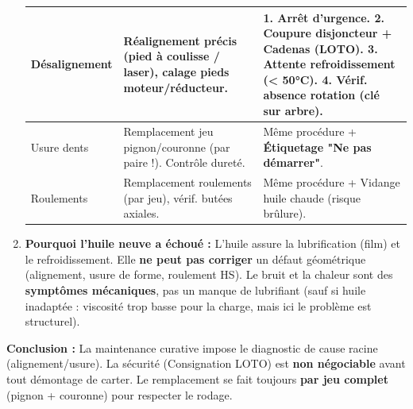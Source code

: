 \documentclass[11pt]{article}
\begin{document}
\begin{exoresolu}
\begin{enumerate}
\begin{center}
\begin{tabularx}{\linewidth}{|l|X|X|}
                      Désalignement & Réalignement précis (pied à coulisse / laser), calage pieds moteur/réducteur. & \textbf{1. Arrêt d'urgence.} \textbf{2. Coupure disjoncteur + Cadenas (LOTO).} \textbf{3. Attente refroidissement (< 50°C).} \textbf{4. Vérif. absence rotation (clé sur arbre).} \\ \hline
                      Usure dents & Remplacement jeu pignon/couronne (par paire !). Contrôle dureté. & Même procédure + \textbf{Étiquetage "Ne pas démarrer"}. \\ \hline
                      Roulements & Remplacement roulements (par jeu), vérif. butées axiales. & Même procédure + Vidange huile chaude (risque brûlure). \\ \hline
                  \end{tabularx}
              \end{center}
        \item \textbf{Pourquoi l'huile neuve a échoué :} L'huile assure la lubrification (film) et le refroidissement. Elle \textbf{ne peut pas corriger} un défaut géométrique (alignement, usure de forme, roulement HS). Le bruit et la chaleur sont des \textbf{symptômes mécaniques}, pas un manque de lubrifiant (sauf si huile inadaptée : viscosité trop basse pour la charge, mais ici le problème est structurel).
    \end{enumerate}
    \textbf{Conclusion :} La maintenance curative impose le diagnostic de cause racine (alignement/usure). La sécurité (Consignation LOTO) est \textbf{non négociable} avant tout démontage de carter. Le remplacement se fait toujours \textbf{par jeu complet} (pignon + couronne) pour respecter le rodage.
\end{exoresolu}
\end{document}
